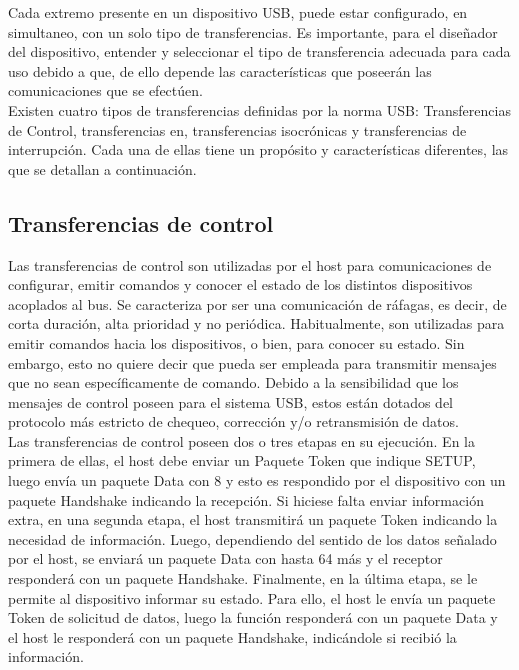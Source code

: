 Cada extremo presente en un dispositivo USB, puede estar configurado, en simultaneo, con un solo tipo de transferencias. Es importante, para el diseñador del dispositivo, entender y seleccionar el tipo de transferencia adecuada para cada uso debido a que, de ello depende las características que poseerán las comunicaciones que se efectúen.\\

Existen cuatro tipos de transferencias definidas por la norma USB: Transferencias de Control, transferencias en, transferencias isocrónicas y transferencias de interrupción. Cada una de ellas tiene un propósito y características diferentes, las que se detallan a continuación.

\subsection{Transferencias de control}
	
	Las transferencias de control son utilizadas por el host para comunicaciones de configurar, emitir comandos y conocer el estado de los distintos dispositivos acoplados al bus. Se caracteriza por ser una comunicación de ráfagas, es decir, de corta duración, alta prioridad y no periódica. Habitualmente, son utilizadas para emitir comandos hacia los dispositivos, o bien, para conocer su estado. Sin embargo, esto no quiere decir que pueda ser empleada para transmitir mensajes que no sean específicamente de comando. Debido a la sensibilidad que los mensajes de control poseen para el sistema USB, estos están dotados del protocolo más estricto de chequeo, corrección y/o retransmisión de datos.\\
	
	Las transferencias de control poseen dos o tres etapas en su ejecución. En la primera de ellas, el host debe enviar un Paquete Token que indique SETUP, luego envía un paquete Data con \SI{8}{\byte} y esto es respondido por el dispositivo con un paquete Handshake indicando la recepción. Si hiciese falta enviar información extra, en una segunda etapa, el host transmitirá un paquete Token indicando la necesidad de información. Luego, dependiendo del sentido de los datos señalado por el host, se enviará un paquete Data con hasta \SI{64}{\byte} más y el receptor responderá con un paquete Handshake. Finalmente, en la última etapa, se le permite al dispositivo informar su estado. Para ello, el host le envía un paquete Token de solicitud de datos, luego la función responderá con un paquete Data y el host le responderá con un paquete Handshake, indicándole si recibió la información.
	
